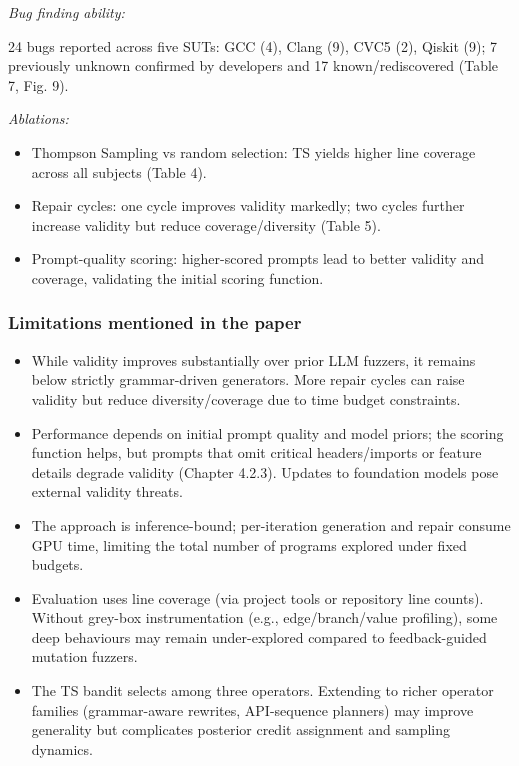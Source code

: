 \lilspace
\textit{Bug finding ability:}

24 bugs reported across five SUTs: GCC (4), Clang (9), CVC5 (2), Qiskit (9); 7 previously unknown confirmed by developers and 17 known/rediscovered (Table 7, Fig. 9).

\lilspace
\textit{Ablations:}

\begin{itemize}
    \item Thompson Sampling vs random selection: TS yields higher line coverage across all subjects (Table 4).
    \item Repair cycles: one cycle improves validity markedly; two cycles further increase validity but reduce coverage/diversity (Table 5).
    \item Prompt-quality scoring: higher-scored prompts lead to better validity and coverage, validating the initial scoring function.
\end{itemize}

\subsubsection{Limitations mentioned in the paper}

\begin{itemize}
    \item While validity improves substantially over prior LLM fuzzers, it remains below strictly grammar-driven generators. More repair cycles can raise validity but reduce diversity/coverage due to time budget constraints.
    
    \item Performance depends on initial prompt quality and model priors; the scoring function helps, but prompts that omit critical headers/imports or feature details degrade validity (Chapter 4.2.3). Updates to foundation models pose external validity threats.
    
    \item The approach is inference-bound; per-iteration generation and repair consume GPU time, limiting the total number of programs explored under fixed budgets.
    
    \item Evaluation uses line coverage (via project tools or repository line counts). Without grey-box instrumentation (e.g., edge/branch/value profiling), some deep behaviours may remain under-explored compared to feedback-guided mutation fuzzers.
    
    \item The TS bandit selects among three operators. Extending to richer operator families (grammar-aware rewrites, API-sequence planners) may improve generality but complicates posterior credit assignment and sampling dynamics.
\end{itemize}

